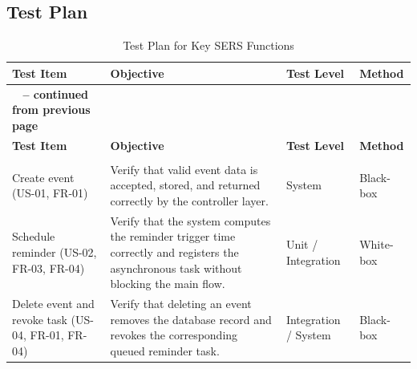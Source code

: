 \subsection{Test Plan}
\begin{xltabular}{\textwidth}{|>{\raggedright\arraybackslash{}}p{0.24\textwidth}|>{\raggedright\arraybackslash{}}X|>{\raggedright\arraybackslash{}}p{0.18\textwidth}|>{\raggedright\arraybackslash{}}p{0.16\textwidth}|}
    \caption{Test Plan for Key SERS Functions} \label{tab:test-plan} \\
    \hline
    \textbf{Test Item} & \textbf{Objective} & \textbf{Test Level} & \textbf{Method} \\
    \hline
    \endfirsthead

    {{\bfseries \tablename\ \thetable{} -- continued from previous page}} \\
    \hline
    \textbf{Test Item} & \textbf{Objective} & \textbf{Test Level} & \textbf{Method} \\
    \hline
    \endhead

    \hline
     \\
    \hline
    \endfoot

    \hline
    \endlastfoot

    Create event (US-01, FR-01) &
    Verify that valid event data is accepted, stored, and returned correctly by the controller layer. &
    System &
    Black-box \\
    \hline
    Schedule reminder (US-02, FR-03, FR-04) &
    Verify that the system computes the reminder trigger time correctly and registers the asynchronous task without blocking the main flow. &
    Unit / Integration &
    White-box \\
    \hline
    Delete event and revoke task (US-04, FR-01, FR-04) &
    Verify that deleting an event removes the database record and revokes the corresponding queued reminder task. &
    Integration / System &
    Black-box \\
    \hline
\end{xltabular}


